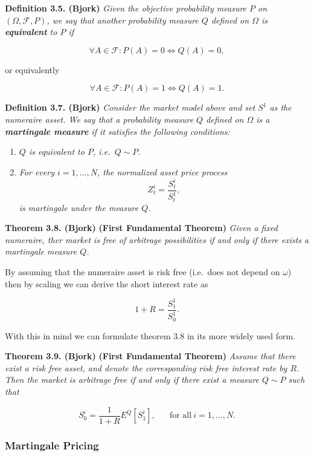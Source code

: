 \documentclass[
]{book}
\providecommand{\tightlist}{%
  \setlength{\itemsep}{0pt}\setlength{\parskip}{0pt}}
\begin{document}
\textbf{Definition 3.5. (Bjork)} \emph{Given the objective probability measure \(P\) on \((\Omega,\mathcal{F},P)\), we say that another probability measure \(Q\) defined on \(\Omega\) is \textbf{equivalent} to \(P\) if}

\[
\forall A\in\mathcal{F}:P(A)=0\iff Q(A)=0,
\]

or equivalently

\[
\forall A\in\mathcal{F}:P(A)=1\iff Q(A)=1.
\]

\textbf{Definition 3.7. (Bjork)} \emph{Consider the market model above and set \(S^1\) as the numeraire asset. We say that a probability measure \(Q\) defined on \(\Omega\) is a \textbf{martingale measure} if it satisfies the following conditions:}

\begin{enumerate}
\def\labelenumi{\arabic{enumi}.}
\tightlist
\item
  \emph{\(Q\) is equivalent to \(P\), i.e.~\(Q\sim P\).}
\item
  \emph{For every \(i=1,...,N\), the normalized asset price process}
  \[
    Z_t^i=\frac{S_t^i}{S_t^1},
    \]
  \emph{is martingale under the measure \(Q\).}
\end{enumerate}

\textbf{Theorem 3.8. (Bjork)} \textbf{(First Fundamental Theorem)} \emph{Given a fixed numeraire, ther market is free of arbitrage possibilities if and only if there exists a martingale measure \(Q\).}

By assuming that the numeraire asset is risk free (i.e.~does not depend on \(\omega\)) then by scaling we can derive the short interest rate as

\[
1+R=\frac{S_1^1}{S_0^1}.
\]

With this in mind we can formulate theorem 3.8 in its more widely used form.

\textbf{Theorem 3.9. (Bjork)} \textbf{(First Fundamental Theorem)} \emph{Assume that there exist a risk free asset, and denote the corresponding risk free interest rate by \(R\). Then the market is arbitrage free if and only if there exist a measure \(Q\sim P\) such that}

\[
S_0^i=\frac{1}{1+R}E^Q[S_1^i],\hspace{20pt}\text{for all}\ i=1,...,N.\tag{3.9}
\]

\hypertarget{martingale-pricing}{%
\subsubsection{Martingale Pricing}\label{martingale-pricing}}
\end{document}
